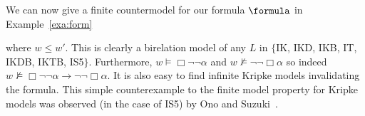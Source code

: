 We can now give a finite countermodel for our formula $\formula$ in Example~\ref{exa:form}

\begin{center}
\end{center}

\noindent
where $w \le w'$. This is clearly a birelation model of any $L$ in
$\{$IK, IKD, IKB, IT, IKDB, IKTB, IS5$\}$. Furthermore,
$w \models \Box\neg\neg \alpha$ and
$w \not \models \neg\neg \Box\alpha$ so indeed
$w \not\models \Box\neg\neg\alpha \to \neg\neg \Box\alpha$. It is also
easy to find infinite Kripke models invalidating the formula. This
simple counterexample to the finite model property for Kripke models
was observed (in the case of IS5) by Ono and Suzuki~\cite{ono1988}.


